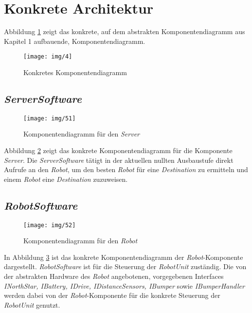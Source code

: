 \section{Konkrete Architektur}

Abbildung \ref{KomponentendiagrammKonkret} zeigt das konkrete, auf dem abstrakten Komponentendiagramm aus Kapitel 1 aufbauende, Komponentendiagramm.

\begin{figure}[H]
	\centering
	\texttt{[image: img/4]}
	\caption{Konkretes Komponentendiagramm}
	\label{KomponentendiagrammKonkret}
\end{figure}

\subsection{\textit{ServerSoftware}}
\begin{figure}[H]
\centering
\texttt{[image: img/51]}
\caption{Komponentendiagramm für den \emph{Server}}
\label{KomponentendiagrammKonkretServer}
\end{figure}
Abbildung \ref{KomponentendiagrammKonkretServer} zeigt das konkrete Komponentendiagramm für die Komponente \emph{Server}. Die \emph{ServerSoftware} tätigt in der aktuellen nullten Ausbaustufe direkt Aufrufe an den \textit{Robot}, 
um den besten \textit{Robot} für eine \textit{Destination} zu ermitteln und einem \textit{Robot} eine \textit{Destination} zuzuweisen.

\subsection{\textit{RobotSoftware}}
\begin{figure}[H]
	\centering
	\texttt{[image: img/52]}
	\caption{Komponentendiagramm für den \emph{Robot}}
	\label{KomponentendiagrammKonkretRobot}
\end{figure}
In Abbildung \ref{KomponentendiagrammKonkretRobot} ist das konkrete Komponentendiagramm der \emph{Robot}-Komponente dargestellt. \emph{RobotSoftware} ist für die Steuerung der \textit{RobotUnit} zuständig. Die von der abstrakten Hardware 
des \textit{Robot} angebotenen, vorgegebenen Interfaces \textit{INorthStar, IBattery, IDrive, IDistanceSensors, IBumper} sowie 
\textit{IBumperHandler} werden dabei von der \textit{Robot}-Komponente für die konkrete Steuerung der \textit{RobotUnit} genutzt.

